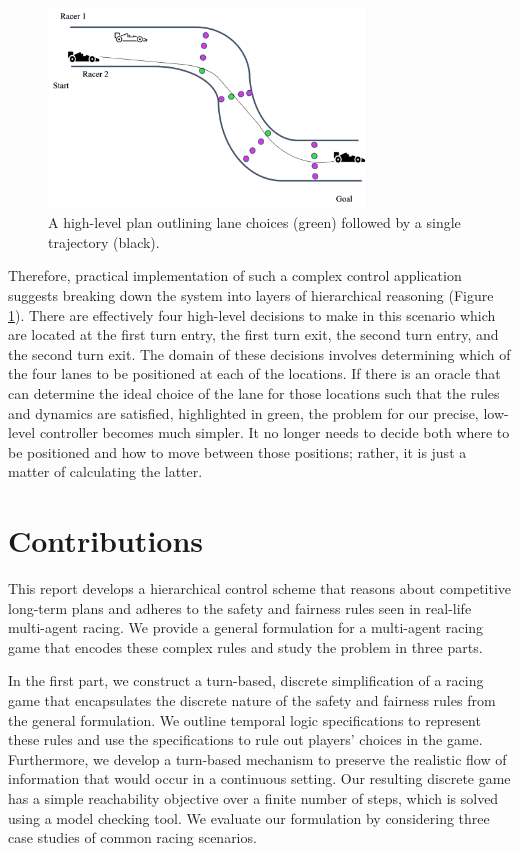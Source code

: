 \begin{figure}
\begin{center}
   \includegraphics[width=0.75\textwidth]{Figures/MotivatingExampleOracle.png}
\caption{A high-level plan outlining lane choices (green) followed by a single trajectory (black).}
\label{fig:motivating_example:oracle}
\end{center}
\end{figure}

Therefore, practical implementation of such a complex control application suggests breaking down the system into layers of hierarchical reasoning (Figure \ref{fig:motivating_example:oracle}). There are effectively four high-level decisions to make in this scenario which are located at the first turn entry, the first turn exit, the second turn entry, and the second turn exit. The domain of these decisions involves determining which of the four lanes to be positioned at each of the locations. If there is an oracle that can determine the ideal choice of the lane for those locations such that the rules and dynamics are satisfied, highlighted in green, the problem for our precise, low-level controller becomes much simpler. It no longer needs to decide both where to be positioned and how to move between those positions; rather, it is just a matter of calculating the latter.

\section{Contributions} %
This report develops a hierarchical control scheme that reasons about competitive long-term plans and adheres to the safety and fairness rules seen in real-life multi-agent racing. We provide a general formulation for a multi-agent racing game that encodes these complex rules and study the problem in three parts.

In the first part, we construct a turn-based, discrete simplification of a racing game that encapsulates the discrete nature of the safety and fairness rules from the general formulation. We outline temporal logic specifications to represent these rules and use the specifications to rule out players' choices in the game. Furthermore, we develop a turn-based mechanism to preserve the realistic flow of information that would occur in a continuous setting. Our resulting discrete game has a simple reachability objective over a finite number of steps, which is solved using a model checking tool. We evaluate our formulation by considering three case studies of common racing scenarios. 

